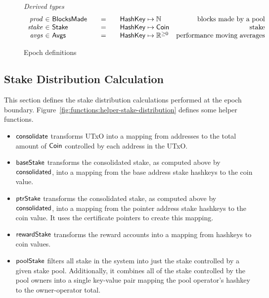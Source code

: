 \begin{figure}[htb]
  \emph{Derived types}
  \begin{equation*}
    \begin{array}{r@{~\in~}l@{\qquad=\qquad}lr}
      \var{prod}
      & \BlocksMade
      & \HashKey \mapsto \N
      & \text{blocks made by a pool} \\
      \var{stake}
      & \Stake
      & \HashKey \mapsto \Coin
      & \text{stake} \\
      \var{avgs}
      & \Avgs
      & \HashKey \mapsto \Rnn
      & \text{performance moving averages} \\
    \end{array}
  \end{equation*}
  \caption{Epoch definitions}
  \label{fig:epoch-defs}
\end{figure}

\subsection{Stake Distribution Calculation}
\label{sec:stake-dist}

This section defines the stake distribution calculations performed at the epoch boundary.
Figure~\ref{fig:functions:helper-stake-distribution} defines some helper functions.
\begin{itemize}
  \item $\mathsf{consolidate}$ transforms UTxO into a mapping from addresses to the total amount
    of $\mathsf{Coin}$ controlled by each address in the UTxO.
  \item $\mathsf{baseStake}$ transforms the consolidated stake, as computed above by
    $\mathsf{consolidated}$, into a mapping from the base address stake hashkeys to the coin value.
  \item $\mathsf{ptrStake}$ transforms the consolidated stake, as computed above by
    $\mathsf{consolidated}$, into a mapping from the pointer address stake hashkeys to the coin value.
    It uses the certificate pointers to create this mapping.
  \item $\mathsf{rewardStake}$ transforms the reward accounts into a mapping from hashkeys to coin
    values.
  \item $\mathsf{poolStake}$ filters all stake in the system into just the stake controlled by a given
    stake pool.  Additionally, it combines all of the stake controlled by the pool owners into
    a single key-value pair mapping the pool operator's hashkey to the owner-operator total.
\end{itemize}

